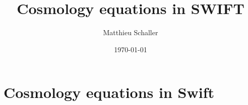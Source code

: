 \documentclass[fleqn, usenatbib, useAMS, a4paper]{mnras}
\title{Cosmology equations in SWIFT}
\author{Matthieu Schaller}
\newcommand{\swift}{{\sc Swift}\xspace}
\begin{document}
\date{\today}

\pagerange{\pageref{firstpage}--\pageref{lastpage}} 

\maketitle

\label{firstpage}

\begin{abstract}
\end{abstract}

\begin{keywords}
\end{keywords}

\section{Cosmology equations in \swift}
\label{sec:cosmo}


















\label{lastpage}
\end{document}
